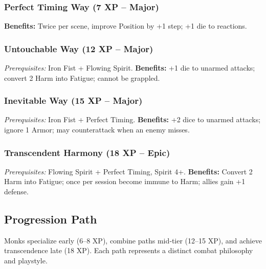 \subsubsection{Perfect Timing Way (7 XP -- Major)}\label{talent:perfect_timing_way}
\textbf{Benefits:} Twice per scene, improve Position by +1 step; +1 die to reactions.

\subsubsection{Untouchable Way (12 XP -- Major)}\label{talent:untouchable_way}
\textit{Prerequisites:} Iron Fist + Flowing Spirit.
\textbf{Benefits:} +1 die to unarmed attacks; convert 2 Harm into Fatigue; cannot be grappled.

\subsubsection{Inevitable Way (15 XP -- Major)}\label{talent:inevitable_way}
\textit{Prerequisites:} Iron Fist + Perfect Timing.
\textbf{Benefits:} +2 dice to unarmed attacks; ignore 1 Armor; may counterattack when an enemy misses.

\subsubsection{Transcendent Harmony (18 XP -- Epic)}\label{talent:transcendent_harmony}
\textit{Prerequisites:} Flowing Spirit + Perfect Timing, Spirit 4+.
\textbf{Benefits:} Convert 2 Harm into Fatigue; once per session become immune to Harm; allies gain +1 defense.

\subsection{Progression Path}
Monks specialize early (6--8 XP), combine paths mid‑tier (12--15 XP), and achieve transcendence late (18 XP). Each path represents a distinct combat philosophy and playstyle.

